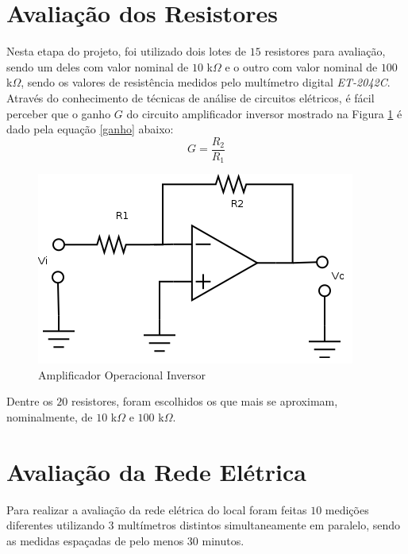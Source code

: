 \documentclass[14pt, oneside]{book}
\newcommand\tab[1][1cm]{\hspace*{#1}}
\theoremstyle{definition}
\begin{document}
            \section{Avaliação dos Resistores}
                \tab Nesta etapa do projeto, foi utilizado dois lotes de $15$ resistores para avaliação, sendo um deles com valor nominal de $10$ k$\Omega$ e o outro com valor nominal de $100$ k$\Omega$, sendo os valores de resistência medidos pelo multímetro digital \textit{ET-2042C}. Através do conhecimento de técnicas de análise de circuitos elétricos, é fácil perceber que o ganho $G$ do circuito amplificador inversor mostrado na Figura \ref{ampop} é dado pela equação \ref{ganho} abaixo:
                \begin{equation}
                    G = \frac{R_2}{R_1}
                    \label{ganho}
                \end{equation}
                \begin{figure}[H]
                    \centering
                    \includegraphics[scale = 0.8]{figura6.png}
                    \caption{Amplificador Operacional Inversor}
                    \label{ampop}
                \end{figure}
                \tab Dentre os $20$ resistores, foram escolhidos os que mais se aproximam, nominalmente, de $10$ k$\Omega$ e $100$ k$\Omega$.
            
            \section{Avaliação da Rede Elétrica}
                \tab Para realizar a avaliação da rede elétrica do local foram feitas $10$ medições diferentes utilizando $3$ multímetros distintos simultaneamente em paralelo, sendo as medidas espaçadas de pelo menos $30$ minutos.
                
\end{document}
